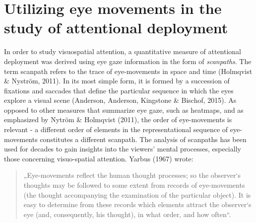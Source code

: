 \documentclass[a4paper, 12pt]{scrreprt}
\begin{document}
\section{Utilizing eye movements in the study of attentional deployment}\label{section:eyeutils}

In order to study visuospatial attention, a quantitative measure of attentional deployment was derived using eye gaze information in the form of \textit{scanpaths}.
The term scanpath refers to the trace of eye-movements in space and time (Holmqvist \& Nyström, 2011). In its most simple form, it is formed by a succession of fixations and saccades that define the particular sequence in which the eyes explore a visual scene (Anderson, Anderson, Kingstone \& Bischof, 2015). As opposed to other measures that summarize eye gaze, such as heatmaps, and as  emphasized by Nytröm \& Holmqvist (2011), the order of eye-movements is relevant - a different order of elements in the representational sequence of eye-movements constitutes a different scanpath. \newline
The analysis of scanpaths has been used for decades to gain insights into the viewers’ mental processes, especially those concerning visuo-spatial attention. Yarbus (1967) wrote: 

\begin{quotation}
\footnotesize{„Eye-movements reflect the human thought processes; so the observer‘s thoughts may be followed to some extent from records of eye-movements (the thought accompanying the examination of the particular object). It is easy to determine from these records which elements attract the observer‘s eye (and, consequently, his thought), in what order, and how often“.}
\end{quotation}
\end{document}
